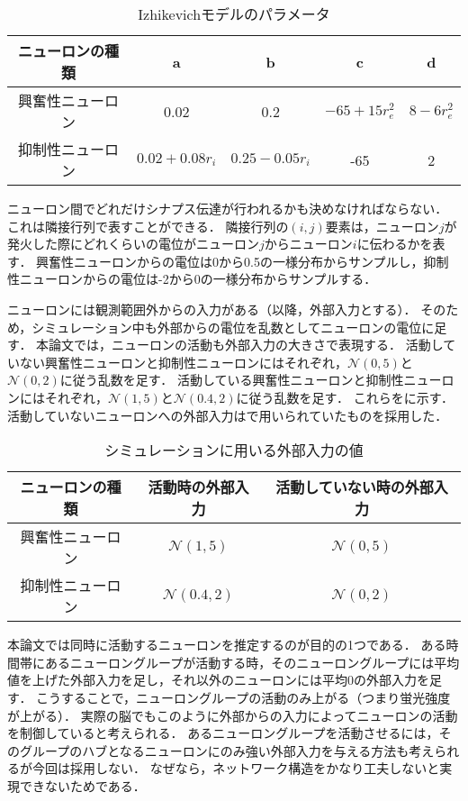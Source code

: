 \begin{table}[htb]
  \center
  \begin{tabular}{|c|cccc|} \hline
    ニューロンの種類 & a & b & c & d \\ \hline
    興奮性ニューロン & 0.02 & 0.2 & $-65 + 15 r_e^2$ & $8 - 6r_e^2$ \\
    抑制性ニューロン & $0.02 + 0.08r_i$ & $0.25 - 0.05 r_i$ & -65 & 2 \\ \hline
  \end{tabular}
  \caption{Izhikevichモデルのパラメータ}
  \label{tab:parameter1}
\end{table}

ニューロン間でどれだけシナプス伝達が行われるかも決めなければならない．
これは隣接行列で表すことができる．
隣接行列の$(i,j)$要素は，ニューロン$j$が発火した際にどれくらいの電位がニューロン$j$からニューロン$i$に伝わるかを表す．
興奮性ニューロンからの電位は0から0.5の一様分布からサンプルし，抑制性ニューロンからの電位は-2から0の一様分布からサンプルする．

ニューロンには観測範囲外からの入力がある（以降，外部入力とする）．
そのため，シミュレーション中も外部からの電位を乱数としてニューロンの電位に足す．
本論文では，ニューロンの活動も外部入力の大きさで表現する．
活動していない興奮性ニューロンと抑制性ニューロンにはそれぞれ，$\mathcal{N}(0,5)$と$\mathcal{N}(0,2)$に従う乱数を足す．
活動している興奮性ニューロンと抑制性ニューロンにはそれぞれ，$\mathcal{N}(1,5)$と$\mathcal{N}(0.4,2)$に従う乱数を足す．
これらをに示す．
活動していないニューロンへの外部入力は\cite{Izhikevich2003}で用いられていたものを採用した．

\begin{table}[htb]
  \center
  \begin{tabular}{|c|cc|} \hline
    ニューロンの種類 & 活動時の外部入力 & 活動していない時の外部入力 \\ \hline
		興奮性ニューロン & $\mathcal{N}(1,5)$ & $\mathcal{N}(0, 5)$ \\
		抑制性ニューロン & $\mathcal{N}(0.4, 2)$ & $\mathcal{N}(0, 2)$ \\ \hline
  \end{tabular}
  \caption{シミュレーションに用いる外部入力の値}
  \label{tab:parameter3}
\end{table}

本論文では同時に活動するニューロンを推定するのが目的の1つである．
ある時間帯にあるニューロングループが活動する時，そのニューロングループには平均値を上げた外部入力を足し，それ以外のニューロンには平均$0$の外部入力を足す．
こうすることで，ニューロングループの活動のみ上がる（つまり蛍光強度が上がる）．
実際の脳でもこのように外部からの入力によってニューロンの活動を制御していると考えられる．
あるニューロングループを活動させるには，そのグループのハブとなるニューロンにのみ強い外部入力を与える方法も考えられるが今回は採用しない．
なぜなら，ネットワーク構造をかなり工夫しないと実現できないためである．

